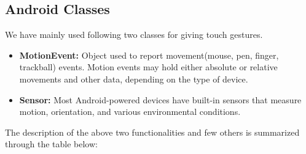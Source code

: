 \documentclass[10pt,conference,letterpaper]{IEEEtran}
\begin{document}
\subsection{Android Classes}
We have mainly used following two classes for giving touch gestures.
\begin{itemize}
\item \textbf{MotionEvent:} Object used to report movement(mouse, pen, finger, trackball) events. Motion events may hold either absolute or relative movements and other data, depending on the type of device. 
\item \textbf{Sensor:} Most Android-powered devices have built-in sensors that measure motion, orientation, and various environmental conditions.
\end{itemize}
The description of the above two functionalities and few others is summarized through the table below:
\end{document}
